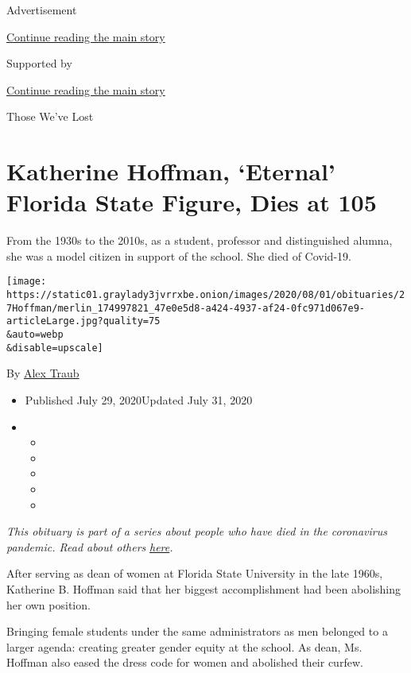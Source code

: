 Advertisement

\protect\hyperlink{after-top}{Continue reading the main story}

Supported by

\protect\hyperlink{after-sponsor}{Continue reading the main story}

Those We've Lost

\hypertarget{katherine-hoffman-eternal-florida-state-figure-dies-at-105}{%
\section{Katherine Hoffman, `Eternal' Florida State Figure, Dies at
105}\label{katherine-hoffman-eternal-florida-state-figure-dies-at-105}}

From the 1930s to the 2010s, as a student, professor and distinguished
alumna, she was a model citizen in support of the school. She died of
Covid-19.

\texttt{[image: https://static01.graylady3jvrrxbe.onion/images/2020/08/01/obituaries/27Hoffman/merlin\_174997821\_47e0e5d8-a424-4937-af24-0fc971d067e9-articleLarge.jpg?quality=75\\\&auto=webp\\\&disable=upscale]}

By \href{https://www.nytimes3xbfgragh.onion/by/alex-traub}{Alex Traub}

\begin{itemize}
\item
  Published July 29, 2020Updated July 31, 2020
\item
  \begin{itemize}
  \item
  \item
  \item
  \item
  \item
  \end{itemize}
\end{itemize}

\emph{This obituary is part of a series about people who have died in
the coronavirus pandemic. Read about others}
\href{https://www.nytimes3xbfgragh.onion/interactive/2020/obituaries/people-died-coronavirus-obituaries.html}{\emph{here}}\emph{.}

After serving as dean of women at Florida State University in the late
1960s, Katherine B. Hoffman said that her biggest accomplishment had
been abolishing her own position.

Bringing female students under the same administrators as men belonged
to a larger agenda: creating greater gender equity at the school. As
dean, Ms. Hoffman also eased the dress code for women and abolished
their curfew.

